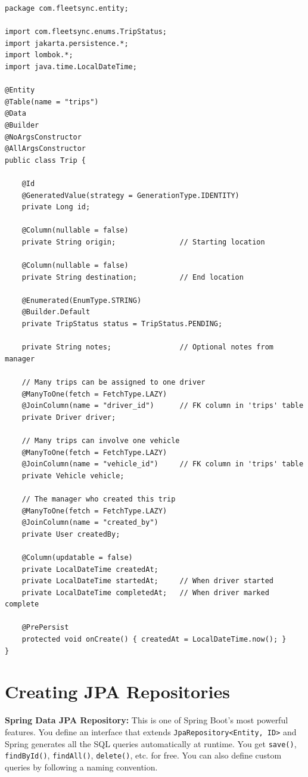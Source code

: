 \documentclass[12pt,a4paper]{report}
\newcommand{\code}[1]{\texttt{\textcolor{keywordblue}{#1}}}
\begin{document}
\begin{lstlisting}[caption=Trip.java -- The Trip Entity]
package com.fleetsync.entity;

import com.fleetsync.enums.TripStatus;
import jakarta.persistence.*;
import lombok.*;
import java.time.LocalDateTime;

@Entity
@Table(name = "trips")
@Data
@Builder
@NoArgsConstructor
@AllArgsConstructor
public class Trip {

    @Id
    @GeneratedValue(strategy = GenerationType.IDENTITY)
    private Long id;

    @Column(nullable = false)
    private String origin;               // Starting location

    @Column(nullable = false)
    private String destination;          // End location

    @Enumerated(EnumType.STRING)
    @Builder.Default
    private TripStatus status = TripStatus.PENDING;

    private String notes;                // Optional notes from manager

    // Many trips can be assigned to one driver
    @ManyToOne(fetch = FetchType.LAZY)
    @JoinColumn(name = "driver_id")      // FK column in 'trips' table
    private Driver driver;

    // Many trips can involve one vehicle
    @ManyToOne(fetch = FetchType.LAZY)
    @JoinColumn(name = "vehicle_id")     // FK column in 'trips' table
    private Vehicle vehicle;

    // The manager who created this trip
    @ManyToOne(fetch = FetchType.LAZY)
    @JoinColumn(name = "created_by")
    private User createdBy;

    @Column(updatable = false)
    private LocalDateTime createdAt;
    private LocalDateTime startedAt;     // When driver started
    private LocalDateTime completedAt;   // When driver marked complete

    @PrePersist
    protected void onCreate() { createdAt = LocalDateTime.now(); }
}
\end{lstlisting}

\section{Creating JPA Repositories}

\begin{tcolorbox}[notebox]
\textbf{Spring Data JPA Repository:} This is one of Spring Boot's most powerful features. You define an interface that extends \code{JpaRepository<Entity, ID>} and Spring generates all the SQL queries automatically at runtime. You get \code{save()}, \code{findById()}, \code{findAll()}, \code{delete()}, etc. for free. You can also define custom queries by following a naming convention.
\end{tcolorbox}
\end{document}
